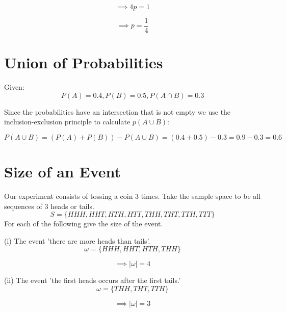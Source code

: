 \documentclass[a4paper,11pt]{article}
\begin{document}
\begin{equation}
\implies 4p = 1
\end{equation}

\begin{equation}
\implies p = \frac{1}{4}
\end{equation}

\section{Union of Probabilities}
Given:
\begin{equation}
P\left(A\right)=0.4,
P\left(B\right)=0.5,
P\left(A \cap B \right)=0.3
\end{equation}

Since the probabilities have an intersection that is not empty we use
the inclusion-exclusion principle to calculate $p\left(A \cup B\right)$:

\begin{equation}
P\left( A \cup B \right) 
= \left( P\left( A \right) + P\left( B \right) \right) - P\left( A \cup B \right)
= (0.4 + 0.5) - 0.3 = 0.9 - 0.3 = 0.6
\end{equation}

\section{Size of an Event}
Our experiment consists of tossing a coin 3 times. Take the sample space
to be all sequences of 3 heads or tails.
\begin{equation}
S = \{HHH, HHT, HTH, HTT, THH, THT, TTH, TTT\}
\end{equation}
For each of the following give the size of the event.

(i) The event 'there are more heads than tails'.
\begin{equation}
\omega = \{HHH, HHT, HTH, THH\}
\end{equation}

\begin{equation}
\implies |\omega| = 4
\end{equation}

(ii) The event 'the first heads occurs after the first tails.'
\begin{equation}
\omega = \{ THH, THT, TTH\}
\end{equation}

\begin{equation}
\implies |\omega| = 3
\end{equation}
\end{document}
